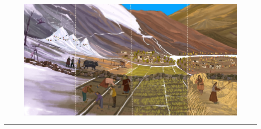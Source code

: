 %
\begin{titlepage}
	\flushright
	\hfill
	\vfill

  \begin{figure}[htb]
  \centering
  \includegraphics[width=\textwidth]{figs/Illustration.jpg}
  \end{figure}
	{\Large\thesisTitle \par}
	\rule[5pt]{\textwidth}{.4pt} \par
	{\large\thesisName}
	\vfill
	\textit{\large\thesisDate} \\
\end{titlepage}


